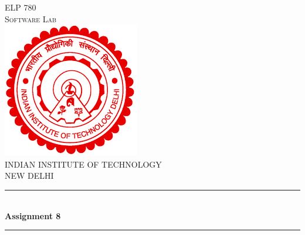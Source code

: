 \documentclass[12pt]{article}
\begin{document}
\begin{titlepage}

\newcommand{\HRule}{\rule{\linewidth}{0.6mm}} %

\center %
 
\textsc{\LARGE ELP 780}\\[0.5cm] %

\textsc{\huge Software Lab}\\[1.5cm] %




\includegraphics[scale=.5]{logo.png}\\[1cm] %
\LARGE{INDIAN INSTITUTE OF TECHNOLOGY}\\
{\Large{NEW DELHI}}\\



\HRule \\[0.4cm]
{ \large \textbf {Assignment 8}}\\[0.4cm] %
\HRule \\[1cm]


\end{titlepage}
\end{document}
